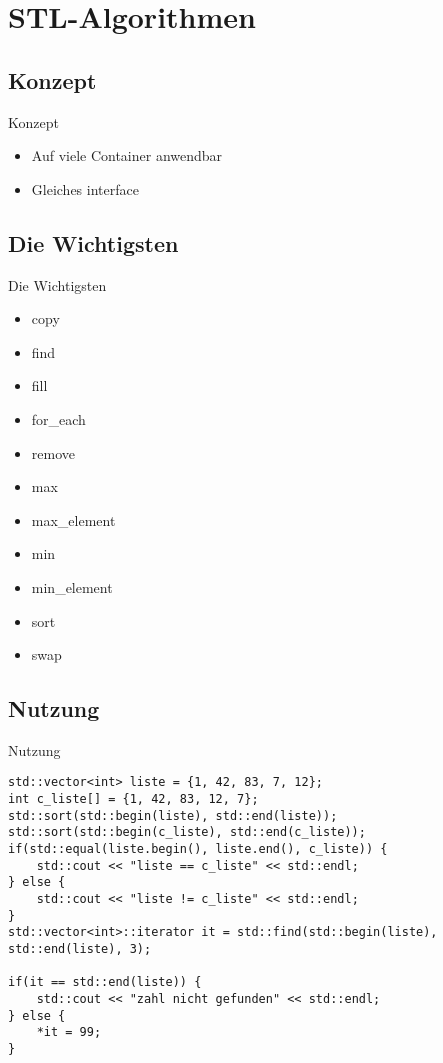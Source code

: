 \section{STL-Algorithmen}


\subsection{Konzept}

\begin{frame}{Konzept}
	\begin{itemize}
		\item Auf viele Container anwendbar
		\item Gleiches interface
	\end{itemize}
\end{frame}

\subsection{Die Wichtigsten}

\begin{frame}{Die Wichtigsten}
	\begin{itemize}
		\item copy
		\item find
		\item fill
		\item for\_each
		\item remove
		\item max
		\item max\_element
		\item min
		\item min\_element
		\item sort
		\item swap
	\end{itemize}
\end{frame}

\subsection{Nutzung}

\begin{frame}[fragile]{Nutzung}
	
	\begin{lstlisting}[escapechar=\$]
std::vector<int> liste = {1, 42, 83, 7, 12};
int c_liste[] = {1, 42, 83, 12, 7};
std::sort(std::begin(liste), std::end(liste));
std::sort(std::begin(c_liste), std::end(c_liste));
if(std::equal(liste.begin(), liste.end(), c_liste)) {
	std::cout << "liste == c_liste" << std::endl;
} else {
	std::cout << "liste != c_liste" << std::endl;
}
std::vector<int>::iterator it = std::find(std::begin(liste), std::end(liste), 3);

if(it == std::end(liste)) {
	std::cout << "zahl nicht gefunden" << std::endl;
} else {
	*it = 99;
}
	\end{lstlisting}
	
\end{frame}

